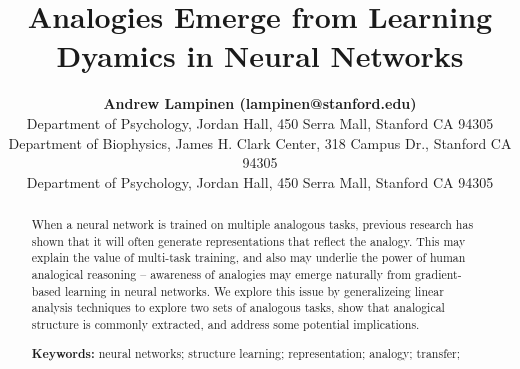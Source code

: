 \documentclass[10pt,letterpaper]{article}
\title{Analogies Emerge from Learning Dyamics in Neural Networks}
\author{{\large \bf Andrew Lampinen (lampinen@stanford.edu)} \\
  Department of Psychology, Jordan Hall, 450 Serra Mall, Stanford CA 94305 
  \AND {\large \bf Shaw Hsu (cshawhsu@stanford.edu)} \\
  Department of Biophysics, James H. Clark Center, 318 Campus Dr., Stanford CA 94305
  \AND {\large \bf James L. McClelland (mcclelland@stanford.edu)} \\
  Department of Psychology, Jordan Hall, 450 Serra Mall, Stanford CA 94305}
\begin{document}
\maketitle


\begin{abstract}
When a neural network is trained on multiple analogous tasks, previous research has shown that it will often generate representations that reflect the analogy. This may explain the value of multi-task training, and also may underlie the power of human analogical reasoning -- awareness of analogies may emerge naturally from gradient-based learning in neural networks. We explore this issue by generalizeing linear analysis techniques to explore two sets of analogous tasks, show that analogical structure is commonly extracted, and address some potential implications. 

\textbf{Keywords:} 
neural networks; structure learning; representation; analogy; transfer; 
\end{abstract}
\end{document}
